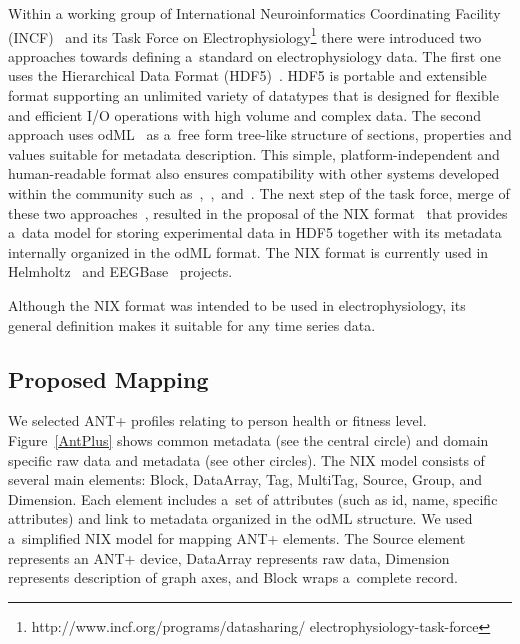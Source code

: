 \documentclass[conference]{IEEEtran}
\begin{document}
Within a working group of International Neuroinformatics Coordinating Facility (INCF)~\cite{wvangeit:Bjaalie:JNeurosci:2007} and its Task Force on Electrophysiology\footnote{http://www.incf.org/programs/datasharing/ electrophysiology-task-force} there were introduced two approaches towards defining a~standard on electrophysiology data. The first one uses the Hierarchical Data Format (HDF5)~\cite{hdf5}. HDF5 is portable and extensible format supporting an unlimited variety of datatypes that is designed for flexible and efficient I/O operations with high volume and complex data. The second approach uses odML~\cite{10.3389/fninf.2011.00016} as a~free form tree-like structure of sections, properties and values suitable for metadata description. This simple, platform-independent and human-readable format also ensures compatibility with other systems developed within the community such as~\cite{10.3389/conf.fninf.2014.18.00029},~\cite{10.3389/conf.fninf.2014.18.00053},~and~\cite{10.3389/conf.fninf.2013.09.00025}. The next step of the task force, merge of these two approaches~\cite{10.3389/conf.fninf.2013.09.00069}, resulted in the proposal of the NIX format~\cite{Stoewer:2014} that provides a~data model for storing experimental data in HDF5 together with its metadata internally organized in the odML format. The NIX format is currently used in Helmholtz~\cite{10.3389/conf.fninf.2013.09.00025} and EEGBase~\cite{ISI:000306821100004} projects.

Although the NIX format was intended to be used in electrophysiology, its general definition makes it suitable for any time series data.


\subsection{Proposed Mapping}

We selected ANT+ profiles relating to person health or fitness level. Figure~\ref{AntPlus} shows common metadata (see the central circle) and domain specific raw data and metadata (see other circles). The NIX model consists of several main elements: Block, DataArray, Tag, MultiTag, Source, Group, and Dimension. Each element includes a~set of attributes (such as id, name, specific attributes) and link to metadata organized in the odML structure. We used a~simplified NIX model for mapping ANT+ elements. The Source element represents an ANT+ device, DataArray represents raw data, Dimension represents description of graph axes, and Block wraps a~complete record.
\end{document}
